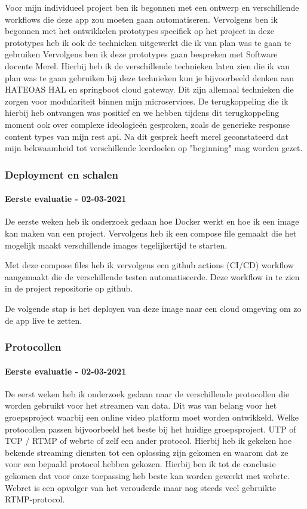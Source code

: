 Voor mijn individueel project ben ik begonnen met een ontwerp en verschillende workflows die deze app zou moeten gaan automatiseren.
Vervolgens ben ik begonnen met het ontwikkelen prototypes specifiek op het project in deze prototypes heb ik ook de technieken uitgewerkt die ik van plan was te gaan te gebruiken
Vervolgens ben ik deze prototypes gaan bespreken met Software docente Merel.
Hierbij heb ik de verschillende technieken laten zien die ik van plan was te gaan gebruiken bij deze technieken kun je bijvoorbeeld denken aan HATEOAS HAL en springboot cloud gateway.
Dit zijn allemaal technieken die zorgen voor modulariteit binnen mijn microservices.
De terugkoppeling die ik hierbij heb ontvangen was positief en we hebben tijdens dit terugkoppeling moment ook over complexe ideologieën gesproken, zoals de generieke response content types van mijn rest api.
Na dit gesprek heeft merel geconstateerd dat mijn bekwaamheid tot verschillende leerdoelen op "beginning" mag worden gezet.


\subsubsection{Deployment en schalen}
\paragraph{Eerste evaluatie - 02-03-2021}
De eerste weken heb ik onderzoek gedaan hoe Docker werkt en hoe ik een image kan maken van een project.
Vervolgens heb ik een compose file gemaakt die het mogelijk maakt verschillende images tegelijkertijd te starten.

Met deze compose files heb ik vervolgens een github actions (CI/CD) workflow aangemaakt die de verschillende testen automatiseerde.
Deze workflow in te zien in de project repositorie op github.

De volgende stap is het deployen van deze image naar een cloud omgeving om zo de app live te zetten.

\subsubsection{Protocollen}\label{subsec:protocollen}
\paragraph{Eerste evaluatie - 02-03-2021}
De eerst weken heb ik onderzoek gedaan naar de verschillende protocollen die worden gebruikt voor het streamen van data.
Dit was van belang voor het groepsproject waarbij een online video platform moet worden ontwikkeld.
Welke protocollen passen bijvoorbeeld het beste bij het huidige groepsproject.
UTP of TCP / RTMP of webrtc of zelf een ander protocol.
Hierbij heb ik gekeken hoe bekende streaming diensten tot een oplossing zijn gekomen en waarom dat ze voor een
bepaald protocol hebben gekozen.
Hierbij ben ik tot de conclusie gekomen dat voor onze toepassing heb beste kan worden gewerkt met webrtc.
Webrct is een opvolger van het verouderde maar nog steeds veel gebruikte RTMP-protocol.

